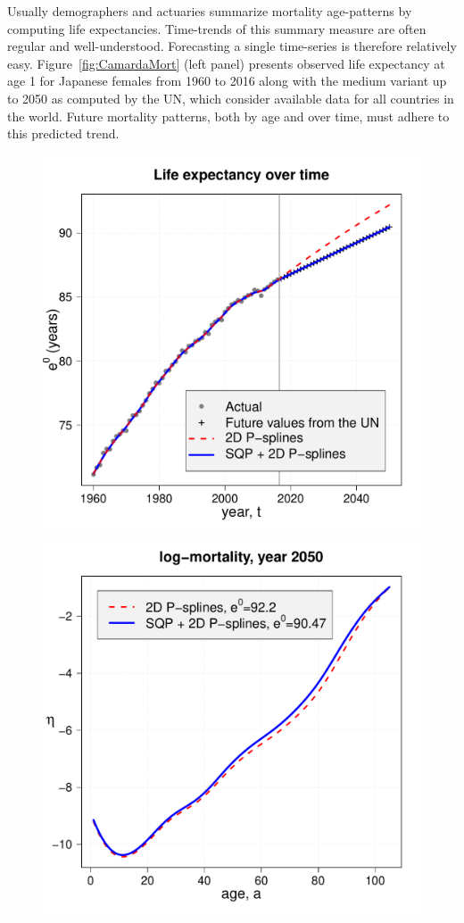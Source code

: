 \documentclass[a4paper,twoside, openright, 12pt, leqno]{article}
\begin{document}
Usually demographers and actuaries summarize mortality age-patterns by computing life expectancies. Time-trends of this summary measure are often regular and well-understood. Forecasting a single time-series is therefore relatively easy. Figure~\ref{fig:CamardaMort} (left panel) presents observed life expectancy at age 1 for Japanese females from 1960 to 2016 along with the medium variant up to 2050 as computed by the UN, which consider available data for all countries in the world.  
Future mortality patterns, both by age and over time, must adhere to this predicted trend. 

\begin{figure}[!ht]\centering
	\includegraphics[scale=0.25]{Figures/CamardaE0.pdf}
	\includegraphics[scale=0.25]{Figures/CamardaMort2050.pdf}

\end{figure}
\end{document}

